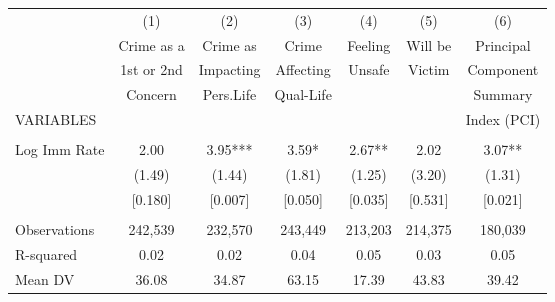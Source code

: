 \begin{tabular}{lcccccc} \hline
 & (1) & (2) & (3) & (4) & (5) & (6) \\
 & Crime as a & Crime as & Crime & Feeling & Will be & Principal \\
 & 1st or 2nd & Impacting & Affecting & Unsafe & Victim & Component \\
 & Concern & Pers.Life & Qual-Life &  &  & Summary \\
VARIABLES &  &  &  &  &  & Index (PCI) \\ \hline
 &  &  &  &  &  &  \\
Log Imm Rate & 2.00 & 3.95*** & 3.59* & 2.67** & 2.02 & 3.07** \\
 & (1.49) & (1.44) & (1.81) & (1.25) & (3.20) & (1.31) \\
 & [0.180] & [0.007] & [0.050] & [0.035] & [0.531] & [0.021] \\
 &  &  &  &  &  &  \\
Observations & 242,539 & 232,570 & 243,449 & 213,203 & 214,375 & 180,039 \\
R-squared & 0.02 & 0.02 & 0.04 & 0.05 & 0.03 & 0.05 \\
 Mean DV & 36.08 & 34.87 & 63.15 & 17.39 & 43.83 & 39.42 \\ \hline
\end{tabular}
